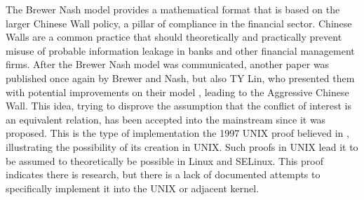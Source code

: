 \documentclass[11pt,titlepage,dvipsnames,table,xcdraw]{article}
\begin{document}
The Brewer Nash model provides a mathematical format that is based on the larger Chinese Wall policy, a pillar of compliance in the financial sector.
Chinese Walls are a common practice that should theoretically and practically prevent misuse of probable information leakage in banks \cite{herzel_chinese_1978} and other financial management firms.
After the Brewer Nash model was communicated, another paper was published once again by Brewer and Nash, but also TY Lin, who presented them with potential improvements on their model \cite{lin_chinese_1989},
leading to the Aggressive Chinese Wall. This idea, trying to disprove the assumption that the conflict of interest is an equivalent relation, has been accepted into the mainstream since it was
proposed. This is the type of implementation the 1997 UNIX proof believed in \cite{foley_building_1997}, illustrating the possibility of its creation in UNIX. Such proofs in UNIX lead it to be assumed to
theoretically be possible in Linux and SELinux. This proof indicates there is research, but there is a lack of documented attempts to specifically implement it into the UNIX or adjacent kernel.
\end{document}

